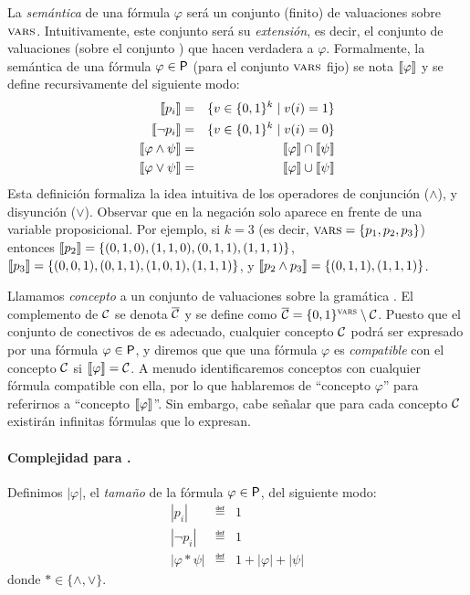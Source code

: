 La {\em semántica} de una fórmula $\varphi$ será un conjunto (finito) de valuaciones sobre $\textsc{vars}$. Intuitivamente, este conjunto será su {\em extensión}, es decir, el conjunto de valuaciones (sobre el conjunto \propvars) que hacen verdadera a $\varphi$. 
%
Formalmente, la semántica de una fórmula $\varphi\in{\sf P}$ (para el conjunto $\textsc{vars}$ fijo) se nota $\llbracket \varphi\rrbracket$ y se define recursivamente del siguiente modo:
%
\begin{eqnarray*}
\llbracket p_i\rrbracket &=& \{ v\in\{0,1\}^k \mid v(i)=1\}\\
\llbracket \lnot p_i\rrbracket &=& \{ v\in\{0,1\}^k \mid v(i)=0\}\\
\llbracket \varphi\wedge\psi\rrbracket &=& \llbracket \varphi\rrbracket\cap\llbracket \psi\rrbracket\\
\llbracket \varphi\vee\psi\rrbracket &=& \llbracket \varphi\rrbracket\cup\llbracket \psi\rrbracket
\end{eqnarray*}
Esta definición formaliza la idea intuitiva de los operadores de conjunción ($\wedge$), y disyunción ($\vee$). Observar que en \grambool la negación solo aparece en frente de una variable proposicional. Por ejemplo, si $k=3$ (es decir, $\textsc{vars}=\{p_1,p_2,p_3\}$) entonces $\llbracket p_2\rrbracket=\{(0,1,0), (1,1,0), (0,1,1), (1,1,1)\}$,  $\llbracket p_3\rrbracket=\{(0,0,1), (0,1,1), (1,0,1), (1,1,1)\}$, y $\llbracket p_2\wedge p_3\rrbracket=\{(0,1,1), (1,1,1)\}$.

Llamamos {\em concepto} a un conjunto de valuaciones sobre la gramática \grambool. El complemento de $\mathcal{C}$ se denota $\overline {\mathcal{C}}$ y se define como $\overline {\mathcal{C}}=\{0,1\}^{\textsc{vars}}\setminus \mathcal{C}$. Puesto que el conjunto de conectivos de \grambool es adecuado, cualquier concepto $\mathcal{C}$ podrá ser expresado por una fórmula $\varphi\in{\sf P}$, y diremos que que una fórmula $\varphi$ es {\em compatible} con el concepto $\mathcal{C}$ si $\llbracket \varphi\rrbracket=\mathcal{C}$. A menudo identificaremos conceptos con cualquier fórmula compatible con ella, por lo que hablaremos de ``concepto $\varphi$'' para referirnos a ``concepto $\llbracket \varphi\rrbracket$''. Sin embargo, cabe señalar que para cada concepto $\mathcal{C}$ existirán infinitas fórmulas que lo expresan.

\paragraph{Complejidad para \grambool.} Definimos $|\varphi|$, el {\em tamaño} de la fórmula $\varphi\in{\sf P}$, del siguiente modo:
\begin{eqnarray*}
|p_i| &\eqdef& 1\\
|\lnot p_i| &\eqdef& 1\\
|\varphi*\psi| &\eqdef& 1+|\varphi|+|\psi|
\end{eqnarray*}
donde $*\in\{\wedge,\vee\}$.

